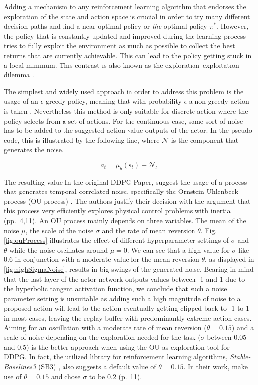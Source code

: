 Adding a mechanism to any reinforcement learning algorithm that endorses the exploration of the state and action space is crucial in order to try many different decision paths and find a near optimal policy or \textit{the} optimal policy $\pi^*$. However, the policy that is constantly updated and improved during the learning process tries to fully exploit the environment as much as possible to collect the best returns that are currently achievable. This can lead to the policy getting stuck in a local minimum. This contrast is also known as the exploration–exploitation dilemma \cite[p.~3]{Sutton1998}.
\par
The simplest and widely used approach in order to address this problem is the usage of an $\epsilon$-greedy policy, meaning that with probability $\epsilon$ a non-greedy action is taken \cite[p.~100]{Sutton1998}. Nevertheless this method is only suitable for discrete action where the policy selects from a set of actions. For the continuous case, some sort of noise has to be added to the suggested action value outputs of the actor. In the pseudo code, this is illustrated by the following line, where $\mathcal{N}$ is the component that generates the noise.
\par
\begin{equation*}
    a_t = \mu_\theta(s_t) + \mathcal{N}_t
\end{equation*}
\par 
The resulting value 
In the original DDPG Paper, \cite{lillicrap2019continuous} suggest the usage of a process that generates temporal correlated noise, specifically the Ornstein-Uhlenbeck process (OU process) \cite[]{uhlenbeck1930theory}. The authors justify their decision with the argument that this process very efficiently explores physical control problems with inertia (pp.~4,11). An OU process mainly depends on three variables. The mean of the noise $\mu$, the scale of the noise $\sigma$ and the rate of mean reversion $\theta$. Fig. \ref{fig:ouProcess} illustrates the effect of different hyperparameter settings of $\sigma$ and $\theta$ while the noise oscillates around $\mu=0$. We can see that a high value for $\sigma$ like $0.6$ in conjunction with a moderate value for the mean reversion $\theta$, as displayed in \ref{fig:highSigmaNoise}, results in big swings of the generated noise. Bearing in mind that the last layer of the actor network outputs values between -1 and 1 due to the hyperbolic tangent activation function, we conclude that such a noise parameter setting is unsuitable as adding such a high magnitude of noise to a proposed action will lead to the action eventually getting clipped back to -1 to 1 in most cases, leaving the replay buffer with predominantly extreme action cases. Aiming for an oscillation with a moderate rate of mean reversion ($\theta = 0.15$) and a scale of noise depending on the exploration needed for the task ($\sigma$ between $0.05$ and $0.5$) is the better approach when using the OU as exploration tool for DDPG. In fact, the utilized library for reinforcement learning algorithms, \textit{Stable-Baselines3} (SB3) \cite[]{stable-baselines3}, also suggests a default value of $\theta = 0.15$. In their work, \cite{lillicrap2019continuous} make use of $\theta = 0.15$ and chose $\sigma$ to be $0.2$ (p.~11).
